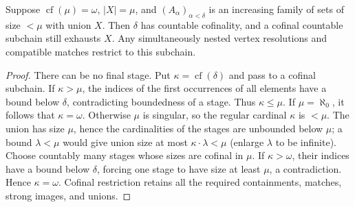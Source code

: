 \begin{lemma}
\label{lem:countable-exhaustion}
Suppose $\operatorname{cf}(\mu)=\omega$, $|X|=\mu$, and
$(A_\alpha)_{\alpha<\delta}$ is an increasing family of sets of size
$<\mu$ with union $X$. Then $\delta$ has countable cofinality, and a
cofinal countable subchain still exhausts $X$. Any simultaneously nested
vertex resolutions and compatible matches restrict to this subchain.
\end{lemma}
\begin{proof}
There can be no final stage. Put $\kappa=\operatorname{cf}(\delta)$
and pass to a cofinal subchain. If $\kappa>\mu$, the indices of the
first occurrences of all elements have a bound below $\delta$,
contradicting boundedness of a stage. Thus $\kappa\leq\mu$.
If $\mu=\aleph_0$, it follows that $\kappa=\omega$.
Otherwise $\mu$ is singular, so the regular cardinal $\kappa$ is $<\mu$.
The union has size $\mu$, hence the cardinalities of the stages are
unbounded below $\mu$; a bound $\lambda<\mu$ would give union size at
most $\kappa\cdot\lambda<\mu$ (enlarge $\lambda$ to be infinite).
Choose countably many stages whose sizes are cofinal in $\mu$.
If $\kappa>\omega$, their indices have a bound below $\delta$, forcing
one stage to have size at least $\mu$, a contradiction. Hence
$\kappa=\omega$. Cofinal restriction retains all the required
containments, matches, strong images, and unions.
\end{proof}

